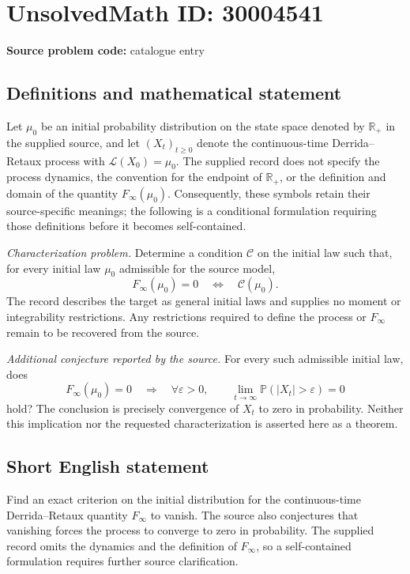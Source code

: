 \documentclass[11pt]{article}
\begin{document}
\section*{UnsolvedMath ID: 30004541}
\textbf{Source problem code:} catalogue entry
\subsection{Definitions and mathematical statement}
Let \(\mu_0\) be an initial probability distribution on the state space denoted by \(\mathbb{R}_+\) in the supplied source, and let \((X_t)_{t\geq 0}\) denote the continuous-time Derrida--Retaux process with \(\mathcal{L}(X_0)=\mu_0\). The supplied record does not specify the process dynamics, the convention for the endpoint of \(\mathbb{R}_+\), or the definition and domain of the quantity \(F_\infty(\mu_0)\). Consequently, these symbols retain their source-specific meanings; the following is a conditional formulation requiring those definitions before it becomes self-contained.

\emph{Characterization problem.} Determine a condition \(\mathcal{C}\) on the initial law such that, for every initial law \(\mu_0\) admissible for the source model,
\[
F_\infty(\mu_0)=0
\quad\Longleftrightarrow\quad
\mathcal{C}(\mu_0).
\]
The record describes the target as general initial laws and supplies no moment or integrability restrictions. Any restrictions required to define the process or \(F_\infty\) remain to be recovered from the source.

\emph{Additional conjecture reported by the source.} For every such admissible initial law, does
\[
F_\infty(\mu_0)=0
\quad\Longrightarrow\quad
\forall\varepsilon>0,\qquad
\lim_{t\to\infty}\mathbb{P}(|X_t|>\varepsilon)=0
\]
hold? The conclusion is precisely convergence of \(X_t\) to zero in probability. Neither this implication nor the requested characterization is asserted here as a theorem.
\subsection{Short English statement}
Find an exact criterion on the initial distribution for the continuous-time Derrida--Retaux quantity \(F_\infty\) to vanish. The source also conjectures that vanishing forces the process to converge to zero in probability. The supplied record omits the dynamics and the definition of \(F_\infty\), so a self-contained formulation requires further source clarification.
\end{document}
